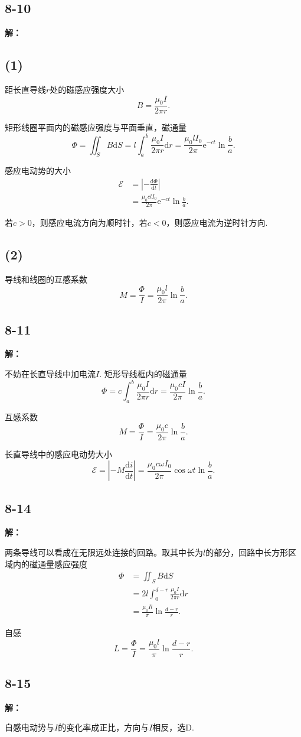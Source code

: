 \documentclass[twocolumn]{ctexart}
\newcommand{\sol}[1]{\subsection*{#1}\noindent\textbf{解：}
	
}
\begin{document}
	\sol{8-10}
	\subsection*{(1)}
	距长直导线$r$处的磁感应强度大小
	$$B=\frac{\mu_0I}{2\pi r}.$$
	
	矩形线圈平面内的磁感应强度与平面垂直，磁通量
	$$\Phi=\iint_{S}B\mathrm dS=l\int_{a}^{b}\frac{\mu_0I}{2\pi r}\mathrm dr=\frac{\mu_0lI_0}{2\pi}\mathrm e^{-ct}\ln\frac{b}{a}.$$
	
	感应电动势的大小
	\begin{align*}
		\mathscr E&=\left|-\frac{\mathrm d\Phi}{\mathrm dt}\right|\\
		&=\frac{\mu_0clI_0}{2\pi}\mathrm e^{-ct}\ln\frac{b}{a}.
	\end{align*}

	若$c>0$，则感应电流方向为顺时针，若$c<0$，则感应电流为逆时针方向.
	\subsection*{(2)}
	导线和线圈的互感系数
	$$M=\frac{\Phi}{I}=\frac{\mu_0l}{2\pi}\ln\frac{b}{a}.$$
	
	\sol{8-11}
	不妨在长直导线中加电流$I$. 矩形导线框内的磁通量
	$$\Phi=c\int_{a}^{b}\frac{\mu_0I}{2\pi r}\mathrm dr=\frac{\mu_0cI}{2\pi}\ln\frac{b}{a}.$$
	
	互感系数
	$$M=\frac{\Phi}{I}=\frac{\mu_0c}{2\pi}\ln\frac{b}{a}.$$
	
	长直导线中的感应电动势大小
	$$\mathscr E=\left|-M\frac{\mathrm di}{\mathrm dt}\right|=\frac{\mu_0c\omega I_0}{2\pi}\cos\omega t\ln\frac{b}{a}.$$
	
	\sol{8-14}
	两条导线可以看成在无限远处连接的回路。取其中长为$l$的部分，回路中长方形区域内的磁通量感应强度
	\begin{align*}
		\Phi&=\iint_S B\mathrm dS\\
		&=2l\int_{0}^{d-r}\frac{\mu_0I}{2\pi r}\mathrm dr\\
		&=\frac{\mu_0Il}{\pi}\ln\frac{d-r}{r}.
	\end{align*}

	自感
	$$L=\frac{\Phi}{I}=\frac{\mu_0l}{\pi}\ln\frac{d-r}{r}.$$
	
	\sol{8-15}
	自感电动势与$I$的变化率成正比，方向与$I$相反，选D.
\end{document}
